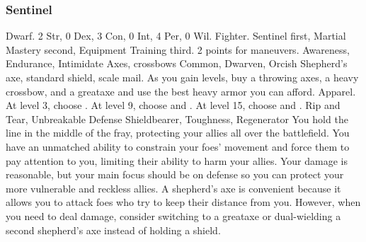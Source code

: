         \subsubsection{Sentinel}
             Dwarf.
             2 Str, 0 Dex, 3 Con, 0 Int, 4 Per, 0 Wil.
             Fighter.
             Sentinel first, Martial Mastery second, Equipment Training third.
             2 points for maneuvers.
             Awareness, Endurance, Intimidate
             Axes, crossbows
             Common, Dwarven, Orcish
             Shepherd's axe, standard shield, scale mail. As you gain levels, buy a throwing axes, a heavy crossbow, and a greataxe and use the best heavy armor you can afford.
             Apparel.
                At level 3, choose .
                At level 9, choose  and .
                At level 15, choose  and .
             Rip and Tear, Unbreakable Defense
             Shieldbearer, Toughness, Regenerator
             You hold the line in the middle of the fray, protecting your allies all over the battlefield.
            You have an unmatched ability to constrain your foes' movement and force them to pay attention to you, limiting their ability to harm your allies.
            Your damage is reasonable, but your main focus should be on defense so you can protect your more vulnerable and reckless allies.
            A shepherd's axe is convenient because it allows you to attack foes who try to keep their distance from you.
            However, when you need to deal damage, consider switching to a greataxe or dual-wielding a second shepherd's axe instead of holding a shield.

